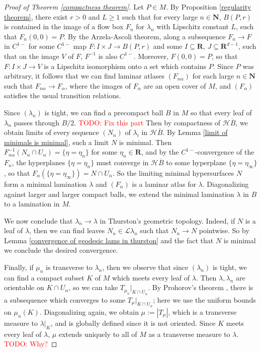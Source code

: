 \documentclass[reqno,11pt]{amsart}
\newcommand{\NN}{\mathbf{N}}
\newcommand{\RR}{\mathbf{R}}
\newcommand{\Leaves}{\mathscr L}
\newcommand{\Hypspace}{\mathscr H}
\theoremstyle{definition}
\numberwithin{equation}{section}
\newcommand\todo[1]{\textcolor{red}{TODO: #1}}
\begin{document}
\begin{proof}[Proof of Theorem \ref{compactness theorem}]
Let $P \in M$.
By Proposition \ref{regularity theorem}, there exist $r > 0$ and $L \geq 1$ such that for every large $n \in \NN$, $B(P, r)$ is contained in the image of a flow box $F_n$ for $\lambda_n$ with Lipschitz constant $L$, such that $F_n(0, 0) = P$.
By the Arzela-Ascoli theorem, along a subsequence $F_n \to F$ in $C^{1-}$ for some $C^{1-}$ map $F: I \times J \to B(P, r)$ and some $I \subseteq \RR$, $J \subseteq \RR^{d - 1}$, such that on the image $V$ of $F$, $F^{-1}$ is also $C^{1-}$.
Moreover, $F(0, 0) = P$, so that $F: I \times J \to V$ is a Lipschitz isomorphism onto a set which contains $P$.
Since $P$ was arbitrary, it follows that we can find laminar atlases $(F_{n\alpha})$ for each large $n \in \NN$ such that $F_{n \alpha} \to F_\alpha$, where the images of $F_\alpha$ are an open cover of $M$, and $(F_\alpha)$ satisfies the usual transition relations.

Since $(\lambda_n)$ is tight, we can find a precompact ball $B$ in $M$ so that every leaf of $\lambda_n$ passes through $B/2$. \todo{Fix this part}
Then by compactness of $\Hypspace \overline B$, we obtain limits of every sequence $(N_n)$ of $\lambda_i$ in $\Hypspace \overline B$.
By Lemma \ref{limit of minimals is minimal}, such a limit $N$ is minimal.
Then $F_{n\alpha}^{-1}(N_n \cap U_\alpha) = \{\eta = \eta_n\}$ for some $\eta_n \in \RR$, and by the $C^{1-}$-convergence of the $F_n$, the hyperplanes $\{\eta = \eta_n\}$ must converge in $\Hypspace \overline B$ to some hyperplane $\{\eta = \eta_\infty\}$, so that $F_\alpha(\{\eta = \eta_\infty\}) = N \cap U_\alpha$.
So the limiting minimal hypersurfaces $N$ form a minimal lamination $\lambda$ and $(F_\alpha)$ is a laminar atlas for $\lambda$.
Diagonalizing against larger and larger compact balls, we extend the minimal lamination $\lambda$ in $B$ to a lamination in $M$.

We now conclude that $\lambda_n \to \lambda$ in Thurston's geometric topology.
Indeed, if $N$ is a leaf of $\lambda$, then we can find leaves $N_n \in \Leaves \lambda_n$ such that $N_n \to N$ pointwise.
So by Lemma \ref{convergence of geodesic lams in thurston} and the fact that $N$ is minimal we conclude the desired convergence.

Finally, if $\mu_n$ is transverse to $\lambda_n$, then we observe that since $(\lambda_n)$ is tight, we can find a compact subset $K$ of $M$ which meets every leaf of $\lambda$.
Then $\lambda, \lambda_n$ are orientable on $K \cap U_\alpha$, so we can take $T_{\mu_n}|_{K \cap U_\alpha}$.
By Prohorov's theorem \cite[Theorem 13.29]{klenke2013probability}, there is a subsequence which converges to some $T_\mu|_{K \cap U_\alpha}$; here we use the uniform bounds on $\mu_n(K)$.
Diagonalizing again, we obtain $\mu := |T_\mu|$, which is a transverse measure to $\lambda|_K$, and is globally defined since it is not oriented.
Since $K$ meets every leaf of $\lambda$, $\mu$ extends uniquely to all of $M$ as a transverse measure to $\lambda$. \todo{Why?}
\end{proof}
\end{document}

